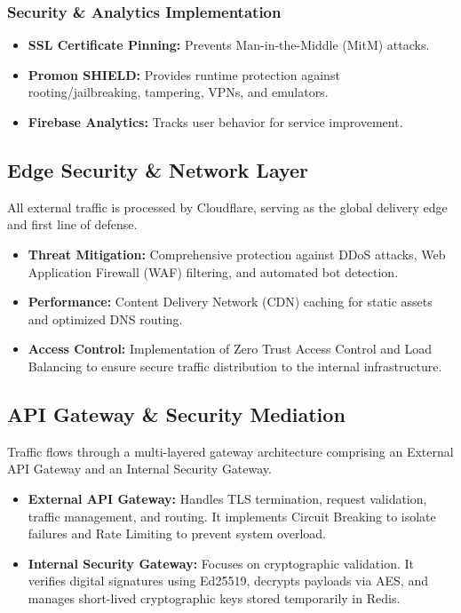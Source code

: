 \documentclass[12pt,oneside,openright,a4paper]{cpe-english-project}
\begin{document}
\subsubsection{Security \& Analytics Implementation}

\begin{itemize}
\item
  \textbf{SSL Certificate Pinning:} Prevents Man-in-the-Middle (MitM)
  attacks.
\item
  \textbf{Promon SHIELD:} Provides runtime protection against
  rooting/jailbreaking, tampering, VPNs, and emulators.
\item
  \textbf{Firebase Analytics:} Tracks user behavior for service
  improvement.
\end{itemize}

\subsection{Edge Security \& Network Layer}

All external traffic is processed by Cloudflare, serving as the global
delivery edge and first line of defense.

\begin{itemize}
\item
  \textbf{Threat Mitigation:} Comprehensive protection against DDoS
  attacks, Web Application Firewall (WAF) filtering, and automated bot
  detection.
\item
  \textbf{Performance:} Content Delivery Network (CDN) caching for
  static assets and optimized DNS routing.
\item
  \textbf{Access Control:} Implementation of Zero Trust Access Control
  and Load Balancing to ensure secure traffic distribution to the
  internal infrastructure.
\end{itemize}

\subsection{API Gateway \& Security Mediation}

Traffic flows through a multi-layered gateway architecture comprising an
External API Gateway and an Internal Security Gateway.

\begin{itemize}
\item
  \textbf{External API Gateway:} Handles TLS termination, request
  validation, traffic management, and routing. It implements Circuit
  Breaking to isolate failures and Rate Limiting to prevent system
  overload.
\item
  \textbf{Internal Security Gateway:} Focuses on cryptographic
  validation. It verifies digital signatures using Ed25519, decrypts
  payloads via AES, and manages short-lived cryptographic keys stored
  temporarily in Redis.
\end{itemize}
\end{document}
